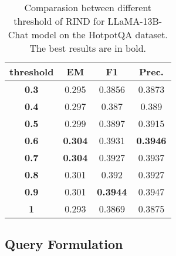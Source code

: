 \begin{table}[t]
\caption{Comparasion between different threshold of RIND for LLaMA-13B-Chat model on the HotpotQA dataset. The best results are in bold.}
\label{tab:threshold}
\centering
\small
\setlength\tabcolsep{5pt} %
\begin{tabular}{cccc}
\toprule
\textbf{threshold} & \textbf{EM}    & \textbf{F1}     & \textbf{Prec.}   \\
\midrule
\textbf{0.3}       & 0.295          & 0.3856          & 0.3873          \\
\textbf{0.4}       & 0.297          & 0.387           & 0.389           \\
\textbf{0.5}       & 0.299          & 0.3897          & 0.3915          \\
\textbf{0.6}       & \textbf{0.304} & 0.3931          & \textbf{0.3946} \\
\textbf{0.7}       & \textbf{0.304} & 0.3927          & 0.3937          \\
\textbf{0.8}       & 0.301          & 0.392           & 0.3927          \\
\textbf{0.9}       & 0.301          & \textbf{0.3944} & 0.3947          \\
\textbf{1}         & 0.293          & 0.3869          & 0.3875         \\
\toprule
\end{tabular}
\end{table}

\subsection{Query Formulation}
\label{sec:how}

